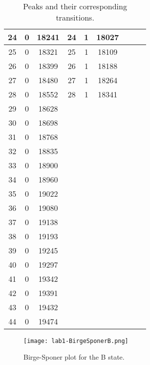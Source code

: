 \documentclass[../labs.tex]{subfiles}
\begin{document}
\begin{table}[H]
\begin{tabular}{|c|c|c|c|c|c|c|c|c|}
        24 & 0 & 18241 & 24 & 1 & 18027 &    &   &      \\ \hline
        25 & 0 & 18321 & 25 & 1 & 18109 &    &   &      \\ \hline
        26 & 0 & 18399 & 26 & 1 & 18188 &    &   &      \\ \hline
        27 & 0 & 18480 & 27 & 1 & 18264 &    &   &      \\ \hline
        28 & 0 & 18552 & 28 & 1 & 18341 &    &   &      \\ \hline
        29 & 0 & 18628 &    &   &       &    &   &      \\ \hline
        30 & 0 & 18698 &    &   &       &    &   &      \\ \hline
        31 & 0 & 18768 &    &   &       &    &   &      \\ \hline
        32 & 0 & 18835 &    &   &       &    &   &      \\ \hline
        33 & 0 & 18900 &    &   &       &    &   &      \\ \hline
        34 & 0 & 18960 &    &   &       &    &   &      \\ \hline
        35 & 0 & 19022 &    &   &       &    &   &      \\ \hline
        36 & 0 & 19080 &    &   &       &    &   &      \\ \hline
        37 & 0 & 19138 &    &   &       &    &   &      \\ \hline
        38 & 0 & 19193 &    &   &       &    &   &      \\ \hline
        39 & 0 & 19245 &    &   &       &    &   &      \\ \hline
        40 & 0 & 19297 &    &   &       &    &   &      \\ \hline
        41 & 0 & 19342 &    &   &       &    &   &      \\ \hline
        42 & 0 & 19391 &    &   &       &    &   &      \\ \hline
        43 & 0 & 19432 &    &   &       &    &   &      \\ \hline
        44 & 0 & 19474 &    &   &       &    &   &      \\ \hline
    \end{tabular}
    \caption{Peaks and their corresponding transitions.}
    \label{tab:peakTransition}
\end{table}

\begin{figure}[H]
    \centering
    \texttt{[image: lab1-BirgeSponerB.png]}
    \caption{Birge-Sponer plot for the B state.}
    \label{fig:BirgeSponerB}
\end{figure}
\end{document}

